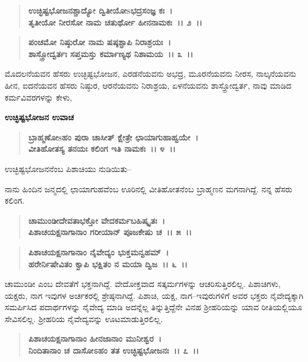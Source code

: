\begin{verse}
\textbf{ಉಚ್ಛಿಷ್ಟಭೋಜನಶ್ಚಾದ್ಯೋ ದ್ವಿತೀಯೋsಭದ್ರಸಂಜ್ಞ ಕಃ~।}\\\textbf{ತೃತೀಯೋ ನೀರಸೋ ನಾಮ ಚತುರ್ಥೋ ಹೀನನಾಮಕಃ~।। ೨~।। }
\end{verse}

\begin{verse}
\textbf{ಪಂಚಮೋ ನಿಷ್ಠುರೋ ನಾಮ ಷಷ್ಠಶ್ಚಾಪಿ ನಿರಾಶ್ರಯಃ~।}\\\textbf{ಶಾಸ್ತ್ರೋದ್ವರ್ತಃ ಸಪ್ತಮಸ್ತು ಕರ್ಮಾಣ್ಯಥ ನಿಶಾಮಯ~।। ೩~।।}
\end{verse}

ಮೊದಲನೆಯವನ ಹೆಸರು ಉಚ್ಛಿಷ್ಟಭೋಜನ, ಎರಡನೆಯವನು ಅಭದ್ರ, ಮೂರನೆಯವನು ನೀರಸ, ನಾಲ್ಕನೆಯವನು ಹೀನ, ಐದನೆಯವನ ಹೆಸರು ನಿಷ್ಠುರ, ಆರನೆಯವನು ನಿರಾಶ್ರಯ, ಏಳನೆಯವನು ಶಾಸ್ತ್ರೋದ್ವರ್ತ, ನಾವು ಮಾಡಿದ ಕರ್ಮವಿವರಗಳನ್ನು ಕೇಳು,

\noindent
\textbf{ಉಚ್ಛಿಷ್ಟಭೋಜನ ಉವಾಚ}

\begin{verse}
\textbf{ಬ್ರಾಹ್ಮಣೋsಹಂ ಪುರಾ ಚಾಸೀತ್ ಕ್ಷೇತ್ರೇ ಛಾಯಾಗುಹಾಹ್ವಯೇ~।}\\\textbf{ವೀತಿಹೋತಸ್ಯ ತನಯಃ ಕಲಿಂಗ ಇತಿ ನಾಮಕಃ~।। ೪~।। }
\end{verse}

\begin{flushleft}
ಉಚ್ಛಿಷ್ಟಭೋಜನನೆಂಬ ಪಿಶಾಚಿಯು ನುಡಿಯಿತು–
\end{flushleft}

ನಾನು ಹಿಂದಿನ ಜನ್ಮದಲ್ಲಿ ಛಾಯಾಗುಹವೆಂಬ ಊರಿನಲ್ಲಿ ವೀತಿಹೋತನೆಂಬ ಬ್ರಾಹ್ಮಣನ ಮಗನಾಗಿದ್ದೆ. ನನ್ನ ಹೆಸರು ಕಲಿಂಗ.

\begin{verse}
\textbf{ಚಾಮುಂಡೀದೇವತಾಭಕ್ತೋ ವೇದಕರ್ಮಬಹಿಷ್ಕೃತಃ~।}\\\textbf{ಪಿಶಾಚಯಕ್ಷನಾಗಾನಾಂ ಗರೀಯಾನ್ ಪೂಜಕೇಷು ಚ~।। ೫~।। }
\end{verse}

\begin{verse}
\textbf{ಪಿಶಾಚಯಕ್ಷನಾಗಾನಾಂ ನೈವೇದ್ಯಂ ಭುಕ್ತಮನ್ವಹಮ್~।}\\\textbf{ಹರೇರ್ನಿಷೇವಿತಂ ಕ್ವಾಪಿ ಭಕ್ಷಿತಂ ನ ಮಯಾ ದ್ವಿಜ~।। ೬~।।}
\end{verse}

ಚಾಮುಂಡೀ ಎಂಬ ದೇವತೆಗೆ ಭಕ್ತನಾಗಿದ್ದೆ. ವೇದೋಕ್ತವಾದ ಸತ್ಕರ್ಮಗಳನ್ನು ಆಚರಿಸುತ್ತಿರಲಿಲ್ಲ. ಪಿಶಾಚಿಗಳು, ಯಕ್ಷರು, ನಾಗ ಇವುಗಳ ಅರ್ಚಕರಲ್ಲಿ ಶ್ರೇಷ್ಠನಾಗಿದ್ದೆ. ಪಿಶಾಚಿ, ಯಕ್ಷ, ನಾಗ–ಇವುರುಗಳಿಗೆ ಅವರ ಭಕ್ತರು ನೈವೇದ್ಯಕ್ಕಾಗಿ ಸಮರ್ಪಿಸಿದ ಪದಾರ್ಥಗಳನ್ನು ನೈವೇದ್ಯ ಮಾಡಿ ಅದನ್ನೆಲ್ಲ ತಿನ್ನುತ್ತಿದ್ದೆನೇ ವಿನಹ ಶ‍್ರೀಹರಿಯನ್ನು ಯಾವ ರೀತಿಯಲ್ಲಿಯೂ ಸೇವಿಸಲಿಲ್ಲ. ಶ‍್ರೀಹರಿಯ ನೈವೇದ್ಯವನ್ನು ಊಟಮಾಡುತ್ತಿರಲಿಲ್ಲ.

\begin{verse}
\textbf{ಪಿಶಾಚಯಕ್ಷನಾಗಾನಾಂ ಹೀನಜಾನಾಂ ಮುನೀಶ್ವರ~।}\\\textbf{ನಿಂದಿತಾನಾಂ ಚ ದಾಸೋಽಹಂ ತತ ಉಚ್ಛಿಷ್ಟಭೋಜನಃ~।। ೭~।।}
\end{verse}

